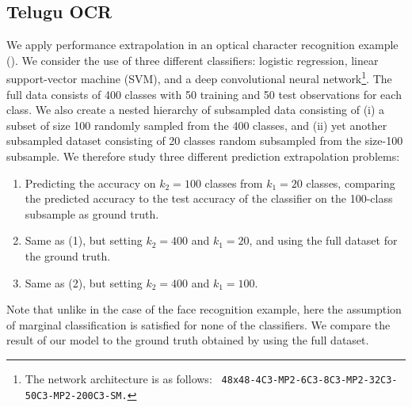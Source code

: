 \documentclass[twoside,11pt]{article}
\begin{document}
\subsection{Telugu OCR}

We apply performance
extrapolation in an optical character recognition example
(\cite{achanta2015telugu}).  We consider
the use of three different classifiers: logistic
regression, linear support-vector machine (SVM), and a
deep convolutional neural network\footnote{The network architecture is
  as follows: {\tt
    48x48-4C3-MP2-6C3-8C3-MP2-32C3-50C3-MP2-200C3-SM.}}. 
The full data consists of 400 classes with 50 training and 50 test observations for each class. We also create a nested hierarchy of subsampled data consisting of (i) a subset of size 100 randomly sampled from the 400 classes, and (ii) yet another subsampled dataset consisting of 20 classes random subsampled from the size-100 subsample.   We therefore study three different prediction extrapolation problems:
\begin{enumerate}
\item Predicting the accuracy on $k_2 = 100$ classes from $k_1 = 20$ classes, comparing the predicted accuracy to the test accuracy of the classifier on the 100-class subsample as ground truth.
\item Same as (1), but setting $k_2 = 400$ and $k_1 = 20$, and using the full dataset for the ground truth.
\item Same as (2), but setting $k_2 = 400$ and $k_1 = 100$.
\end{enumerate}
Note that unlike in the case of the face recognition example,
here the assumption of marginal classification is satisfied for none of
the classifiers.  
We compare the result of our model to the ground
truth obtained by using the full dataset.
\end{document}
